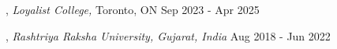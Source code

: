 
, \textit{Loyalist College,} {Toronto, ON}	\hfill Sep 2023 - Apr 2025

, \textit{Rashtriya Raksha University, Gujarat, India} \hfill	Aug 2018 - Jun 2022




